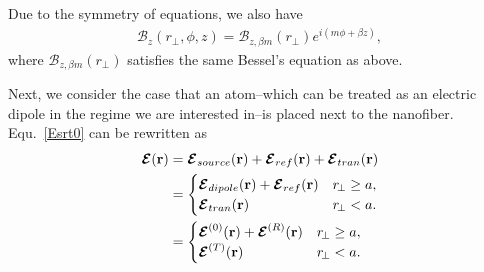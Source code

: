Due to the symmetry of equations, we also have
\begin{align}
\mathcal{B}_z(r\!_\perp,\phi,z) = \mathcal{B}_{z,\beta m}(r\!_\perp)e^{i(m\phi+\beta z)},
\end{align}
where $  \mathcal{B}_{z,\beta m}(r\!_\perp) $ satisfies the same Bessel's equation as above. 

Next, we consider the case that an atom--which can be treated as an electric dipole in the regime we are interested in--is placed next to the 
nanofiber. Equ.~\eqref{Esrt0} can be rewritten as 
\begin{align}
\boldsymbol{\mathcal{E}}(\br) &= \boldsymbol{\mathcal{E}}_{source}(\br) + 
\boldsymbol{\mathcal{E}}_{ref}(\br)+\boldsymbol{\mathcal{E}}_{tran}(\br)\\
&=
	\begin{cases}
	  \boldsymbol{\mathcal{E}}_{dipole} (\br)+ \boldsymbol{\mathcal{E}}_{ref}(\br) & r\!_\perp \geq a,\\
	  \boldsymbol{\mathcal{E}}_{tran}(\br) & r\!_\perp<a.
	\end{cases} \\
&=
	\begin{cases}
		  \boldsymbol{\mathcal{E}}^{(0)} (\br)+ \boldsymbol{\mathcal{E}}^{(R)}(\br) & r\!_\perp \geq a,\\
		  \boldsymbol{\mathcal{E}}^{(T)}(\br) & r\!_\perp<a.
		\end{cases} \label{Etotalfiber}
\end{align}


